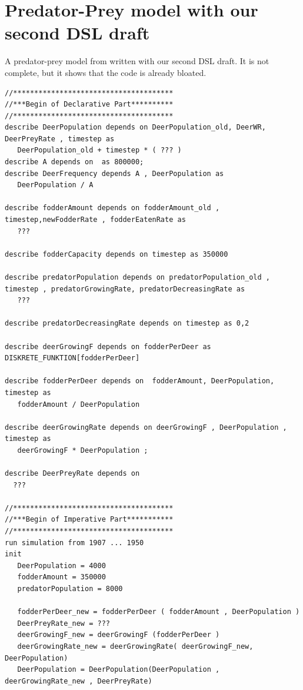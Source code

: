 \section{Predator-Prey model with our second DSL draft} \label{sec:second_dsl_draft}
\par
A predator-prey model from \autocite{dsl:dynamo} written with our second DSL draft. It is not complete, but it shows that the code is already bloated.
\newline
\begin{lstlisting}
//**************************************
//***Begin of Declarative Part**********
//**************************************
describe DeerPopulation depends on DeerPopulation_old, DeerWR, DeerPreyRate , timestep as
   DeerPopulation_old + timestep * ( ??? )
describe A depends on  as 800000;
describe DeerFrequency depends A , DeerPopulation as
   DeerPopulation / A  

describe fodderAmount depends on fodderAmount_old , timestep,newFodderRate , fodderEatenRate as
   ???

describe fodderCapacity depends on timestep as 350000

describe predatorPopulation depends on predatorPopulation_old , timestep , predatorGrowingRate, predatorDecreasingRate as
   ???

describe predatorDecreasingRate depends on timestep as 0,2

describe deerGrowingF depends on fodderPerDeer as  DISKRETE_FUNKTION[fodderPerDeer]

describe fodderPerDeer depends on  fodderAmount, DeerPopulation, timestep as
   fodderAmount / DeerPopulation

describe deerGrowingRate depends on deerGrowingF , DeerPopulation , timestep as
   deerGrowingF * DeerPopulation ;       

describe DeerPreyRate depends on
  ???

//**************************************
//***Begin of Imperative Part***********
//**************************************
run simulation from 1907 ... 1950
init
   DeerPopulation = 4000
   fodderAmount = 350000
   predatorPopulation = 8000  

   fodderPerDeer_new = fodderPerDeer ( fodderAmount , DeerPopulation )
   DeerPreyRate_new = ???
   deerGrowingF_new = deerGrowingF (fodderPerDeer )
   deerGrowingRate_new = deerGrowingRate( deerGrowingF_new, DeerPopulation)
   DeerPopulation = DeerPopulation(DeerPopulation , deerGrowingRate_new , DeerPreyRate)
\end{lstlisting}

















 







